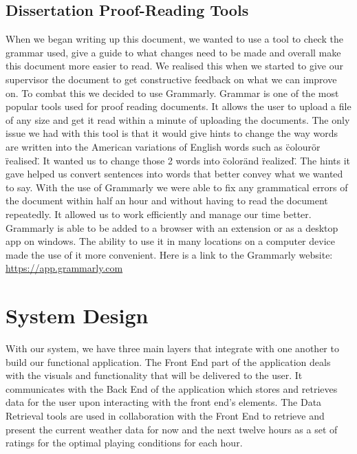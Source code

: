 \section{Dissertation Proof-Reading Tools}
When we began writing up this document, we wanted to use a tool to check the grammar used, give a guide to what changes need to be made and overall make this document more easier to read. We realised this when we started to give our supervisor the document to get constructive feedback on what we can improve on.  To combat this we decided to use Grammarly. \newline \newline
Grammar is one of the most popular tools used for proof reading documents.  It allows the user to upload a file of any size and get it read within a minute of uploading the documents. The only issue we had with this tool is that it would give hints to change the way words are written into the American variations of English words such as \"colour\" or \"realised\". It wanted us to change those 2 words into \"color\" and \"realized\". The hints it gave helped us convert sentences into words that better convey what we wanted to say.
\newline \newline
With the use of Grammarly we were able to fix any grammatical errors of the document within half an hour and without having to read the document repeatedly. It allowed us to work efficiently and manage our time better. Grammarly is able to be added to a browser with an extension or as a desktop app on windows. The ability to use it in many locations on a computer device made the use of it more convenient. \newline
Here is a link to the Grammarly website: {\url{https://app.grammarly.com}}
\chapter{System Design}
With our system, we have three main layers that integrate with one another to build our functional application. The Front End part of the application deals with the visuals and functionality that will be delivered to the user. It communicates with the Back End of the application which stores and retrieves data for the user upon interacting with the front end’s elements. The Data Retrieval tools are used in collaboration with the Front End to retrieve and present the current weather data for now and the next twelve hours as a set of ratings for the optimal playing conditions for each hour.

